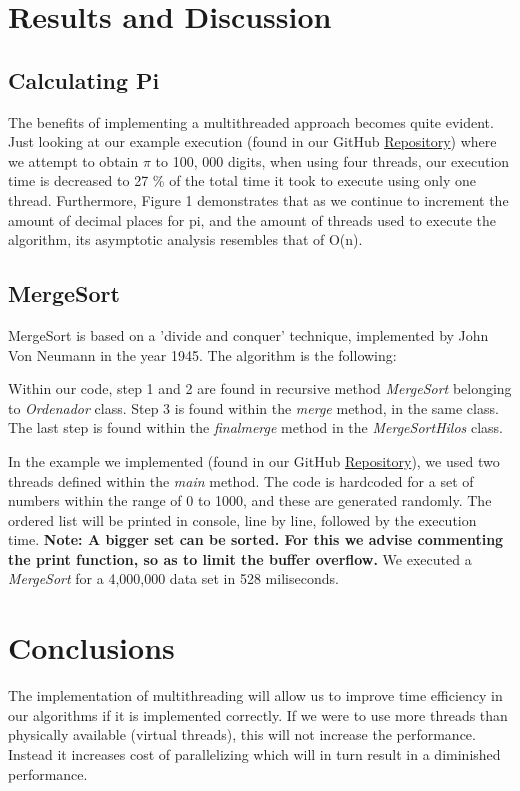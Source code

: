 \documentclass[10pt,a4paper]{article}
\theoremstyle{definition}
\begin{document}
\section{Results and Discussion}
\subsection{Calculating Pi}

The benefits of implementing a multithreaded approach becomes quite evident. Just looking at our example execution (found in our GitHub \href{https://github.com/ezevallos/CC462_EjemplosConcurrencia}{Repository}) where we attempt to obtain \(\pi\) to 100, 000 digits, when using four threads, our execution time is decreased to 27 \% of the total time it took to execute using only one thread. Furthermore, Figure 1 demonstrates that as we continue to increment the amount of decimal places for pi, and the amount of threads used to execute the algorithm, its asymptotic analysis resembles that of O(n).

\subsection{MergeSort}
MergeSort is based on a 'divide and conquer' technique, implemented by John Von Neumann in the year 1945. The algorithm is the following:

Within our code, step 1 and 2 are found in recursive method \emph{MergeSort} belonging to \emph{Ordenador} class. Step 3 is found within the \emph{merge} method, in the same class. The last step is found within the \emph{finalmerge} method in the \emph{MergeSortHilos} class.

In the example we implemented (found in our GitHub \href{https://github.com/ezevallos/CC462_EjemplosConcurrencia}{Repository}), we used two threads defined within the \emph{main} method. The code is hardcoded for a set of numbers within the range of 0 to 1000, and these are generated randomly. The ordered list will be printed in console, line by line, followed by the execution time. \textbf{Note: A bigger set can be sorted. For this we advise commenting the print function, so as to limit the buffer overflow.} We executed a \emph{MergeSort} for a 4,000,000 data set in 528 miliseconds. 

\section{Conclusions}
The implementation of multithreading will allow us to improve time efficiency in our algorithms if it is implemented correctly. If we were to use more threads than physically available (virtual threads), this will not increase
the performance. Instead it increases cost of parallelizing which will in turn result in a diminished performance.
\end{document}
